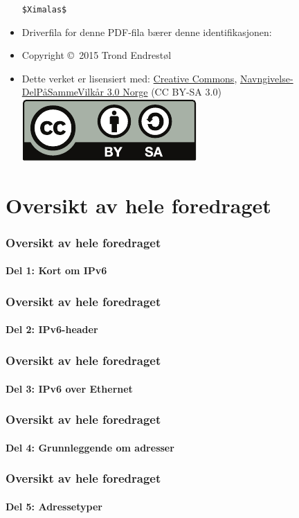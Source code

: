 \begin{frame}[allowframebreaks]
\begin{itemize}
    \texttt{\$${}$Ximalas${}$\$}
  \item Driverfila for denne PDF-fila bærer denne identifikasjonen:\\
    \svndriverfil
  \item Copyright \copyright\ 2015 Trond Endrestøl
  \item Dette verket er lisensiert med:
    \href{http://creativecommons.org/}{Creative Commons},
    \href{http://creativecommons.org/licenses/by-sa/3.0/no/}{Navngivelse-DelPåSammeVilkår
      3.0 Norge} (CC BY-SA
    3.0)\hfill\includegraphics[scale=.25]{by-sa.pdf}
  \end{itemize}
\end{frame}

\section*{Oversikt av hele foredraget}
\begin{frame}%
  \frametitle{Oversikt av hele foredraget}
  \framesubtitle{Del 1: Kort om IPv6}
  \tableofcontents[part=1]%
\end{frame}

\begin{frame}%
  \frametitle{Oversikt av hele foredraget}
  \framesubtitle{Del 2: IPv6-header}
  \tableofcontents[part=2]%
\end{frame}

\begin{frame}%
  \frametitle{Oversikt av hele foredraget}
  \framesubtitle{Del 3: IPv6 over Ethernet}
  \tableofcontents[part=3]%
\end{frame}

\begin{frame}%
  \frametitle{Oversikt av hele foredraget}
  \framesubtitle{Del 4: Grunnleggende om adresser}
  \tableofcontents[part=4]%
\end{frame}

\begin{frame}%
  \frametitle{Oversikt av hele foredraget}
  \framesubtitle{Del 5: Adressetyper}
  \tableofcontents[part=5]%
\end{frame}

